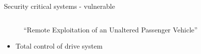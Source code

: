 \documentclass{beamer}
\begin{document}
\begin{frame}{Security critical systems - vulnerable}
\begin{columns}
\begin{column}{0.5\textwidth}
\begin{figure}
                \caption{``Remote Exploitation of an Unaltered Passenger Vehicle'' \cite{greenberg_hackers_2015,miller_remote_2015}}
                \label{jeep_offroad}
            \end{figure}
            \pause
            \begin{itemize}
                \item Total control of drive system
            \end{itemize}
        \end{column}
    \end{columns}
\end{frame}


\end{document}
